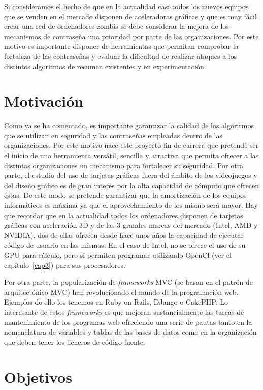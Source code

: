 Si consideramos el hecho de que en la actualidad casi todos los nuevos equipos que se venden en el mercado disponen de aceleradoras gráficas y que es muy fácil crear una red de ordenadores zombis se debe considerar la mejora de los mecanismos de contraseña una prioridad por parte de las organizaciones. Por este motivo es importante disponer de herramientas que permitan comprobar la fortaleza de las contraseñas y evaluar la dificultad de realizar ataques a los distintos algoritmos de resumen existentes y en experimentación.

\section{Motivación}

Como ya se ha comentado, es importante garantizar la calidad de los algoritmos que se utilizan en seguridad y las contraseñas empleadas dentro de las organizaciones. Por este motivo nace este proyecto fin de carrera que pretende ser el inicio de una herramienta versátil, sencilla y atractiva que permita ofrecer a las distintas organizaciones un mecanismo para fortalecer su seguridad. Por otra parte, el estudio del uso de tarjetas gráficas fuera del ámbito de los videojuegos y del diseño gráfico es de gran interés por la alta capacidad de cómputo que ofrecen éstas. De este modo se pretende garantizar que la amortización de los equipos informáticos es máxima ya que el aprovechamiento de los mismo será mayor. Hay que recordar que en la actualidad todos los ordenadores disponen de tarjetas gráficas con aceleración 3D y de las 3 grandes marcas del mercado (Intel, AMD y NVIDIA), dos de ellas ofrecen desde hace unos años la capacidad de ejecutar código de usuario en las mismas. En el caso de Intel, no se ofrece el uso de su GPU para cálculo, pero si permiten programar utilizando OpenCl (ver el capítulo~\ref{cap3}) para sus procesadores.

Por otra parte, la popularización de \emph{frameworks} MVC (se basan en el patrón de arquitectónico MVC) han revolucionado el mundo de la programación web. Ejemplos de ello los tenemos en Ruby on Rails, DJango o CakePHP. Lo interesante de estos \emph{frameworks} es que mejoran sustancialmente las tareas de mantenimiento de los programas web ofreciendo una serie de pautas tanto en la nomenclatura de variables y tablas de las bases de datos como en la organización que deben tener los ficheros de código fuente.

\section{Objetivos}

